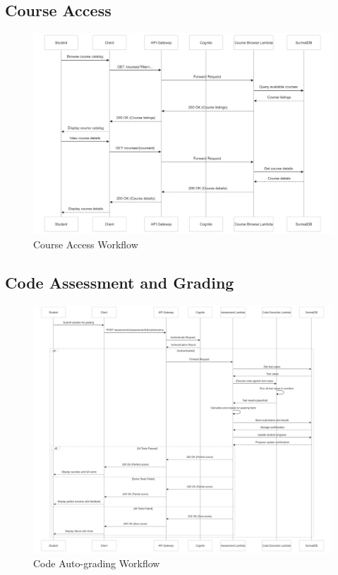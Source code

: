 \documentclass[a4paper, 11pt]{scrreprt}
\begin{document}
\subsection{Course Access}
\begin{figure}[!htb]
    \centering
    \includegraphics[height=0.4\textheight]{student_access_course.png}
    \caption{Course Access Workflow}
\end{figure}

\subsection{Code Assessment and Grading}
\begin{figure}[!htb]
    \centering
    \includegraphics[height=0.4\textheight]{code_grade.png}
    \caption{Code Auto-grading Workflow}
\end{figure}
\end{document}
